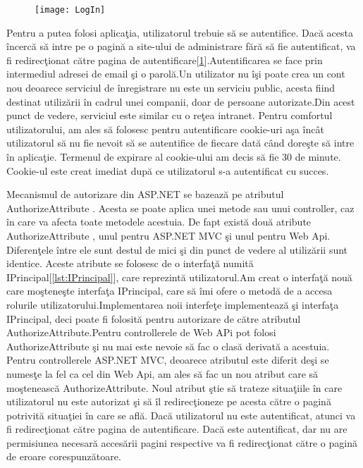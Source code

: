 \documentclass[a4paper,12pt]{report}
\let\oldref\ref
\renewcommand{\ref}[1]{[\oldref{#1}]}
\begin{document}
\begin{figure}[ht]
	\texttt{[image: LogIn]}
	\label{fig:LogIn}
\end{figure}
Pentru a putea folosi aplica\c tia, utilizatorul trebuie s\u a se autentifice. Dac\u a acesta \^incerc\u a s\u a intre pe o pagin\u a a site-ului
de administrare f\u ar\u a s\u a fie autentificat, va fi redirec\c tionat c\u atre pagina de autentificare\ref{fig:LogIn}.Autentificarea se face prin 
intermediul adresei de email \c si o parol\u a.Un utilizator nu \^i\c si poate crea un cont nou deoarece serviciul 
de \^inregistrare nu este un serviciu public, acesta fiind destinat utiliz\u arii \^in cadrul unei companii, doar de 
persoane autorizate.Din acest punct de vedere, serviciul este similar cu o re\c tea intranet.
Pentru comfortul utilizatorului, am ales s\u a folosesc pentru autentificare cookie-uri a\c sa \^inc\^at
utilizatorul s\u a nu fie nevoit s\u a se autentifice de fiecare dat\u a c\^and dore\c ste s\u a intre \^in
aplica\c tie. Termenul de expirare al cookie-ului am decis s\u a fie 30 de minute. Cookie-ul este creat imediat dup\u a ce 
utilizatorul s-a autentificat cu succes.

Mecanismul de autorizare din ASP.NET se bazeaz\u a pe atributul AuthorizeAttribute . Acesta se poate aplica unei metode
sau unui controller, caz \^in care va afecta toate metodele acestuia. De fapt exist\u a dou\u a atribute AuthorizeAttribute ,
unul pentru ASP.NET MVC \c si unul pentru Web Api. Diferen\c tele \^intre ele sunt destul de mici \c si din punct de vedere al utiliz\u arii
sunt identice. Aceste atribute se folosesc de o interfa\c t\u a numit\u a IPrincipal\ref{lst:IPrincipal}, care reprezint\u a utilizatorul.Am creat o interfa\c t\u a nou\u a care mo\c stene\c ste 
interfa\c ta IPrincipal, care s\u a \^imi ofere o metod\u a de a accesa rolurile utilizatorului.Implementarea noii interfe\c te implementeaz\u a
\c si interfa\c ta IPrincipal, deci poate fi folosit\u a pentru autorizare de c\u atre atributul AuthorizeAttribute.Pentru 
controllerele de Web APi pot folosi AuthorizeAttribute  \c si nu mai este nevoie s\u a fac o clas\u a derivat\u a a acestuia.
Pentru controllerele ASP.NET MVC, deoarece atributul este diferit de\c si se numes\c te la fel ca cel din Web Api, am ales s\u a
fac un nou atribut care s\u a mo\c steneasc\u a AuthorizeAttribute. Noul atribut \c stie s\u a trateze situa\c tiile 
\^in care utilizatorul nu este autorizat \c si s\u a \^il redirec\c tioneze pe acesta c\u atre o pagin\u a potrivit\u a situa\c tiei \^in 
care se afl\u a. Dac\u a utilizatorul nu este autentificat, atunci va fi redirec\c tionat c\u atre pagina de autentificare. Dac\u a 
este autentificat, dar nu are permisiunea necesar\u a acces\u arii pagini respective va fi redirec\c tionat c\u atre o pagin\u a de eroare 
corespunz\u atoare.
\end{document}
